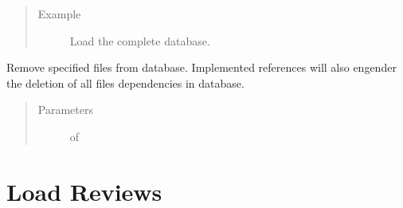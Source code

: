 \documentclass[letterpaper,10pt,english]{sphinxmanual}
\begin{document}
\begin{fulllineitems}
\begin{quote}
\begin{description}
\item[{Example}] \leavevmode
Load the complete database.

%
\begin{sphinxVerbatim}[commandchars=\\\{\}]
   
  
\end{sphinxVerbatim}

\end{description}\end{quote}

\end{fulllineitems}


\begin{fulllineitems}
\label{\detokenize{load:loacore.load.file_load.remove_files}}
Remove specified files from database. Implemented references will also engender the deletion of all files
dependencies in database.
\begin{quote}\begin{description}
\item[{Parameters}] \leavevmode
{} \textendash{}  of {\hyperref[\detokenize{classes:loacore.classes.classes.File}]{}}

\end{description}\end{quote}

\end{fulllineitems}



\section{Load Reviews}
\label{\detokenize{load:module-loacore.load.review_load}}\label{\detokenize{load:load-reviews}}
\end{document}
